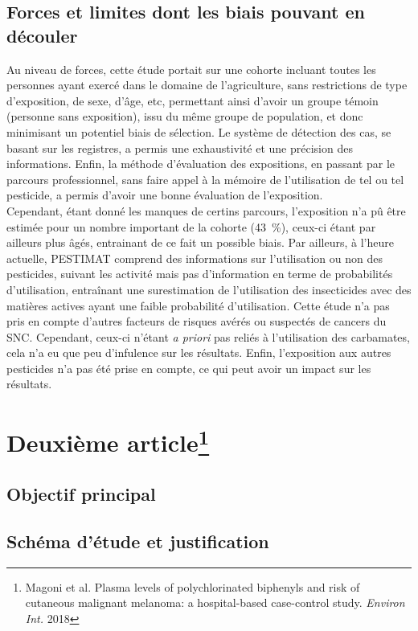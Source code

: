 \documentclass[10pt]{article}
\begin{document}
\subsection{Forces et limites dont les biais pouvant en découler}
Au niveau de forces, cette étude portait sur une cohorte incluant toutes les personnes ayant exercé dans le domaine de l'agriculture, sans restrictions de type d'exposition, de sexe, d'âge, etc, permettant ainsi d'avoir un groupe témoin (personne sans exposition), issu du même groupe de population, et donc minimisant un potentiel biais de sélection. Le système de détection des cas, se basant sur les registres, a permis une exhaustivité et une précision des informations. Enfin, la méthode d'évaluation des expositions, en passant par le parcours professionnel, sans faire appel à la mémoire de l'utilisation de tel ou tel pesticide, a permis d'avoir une bonne évaluation de l'exposition.\\
Cependant, étant donné les manques de certins parcours, l'exposition n'a pû être estimée pour un nombre important de la cohorte (43~\%), ceux-ci étant par ailleurs plus âgés, entrainant de ce fait un possible biais. Par ailleurs, à l'heure actuelle, PESTIMAT comprend des informations sur l'utilisation ou non des pesticides, suivant les activité mais pas d'information en terme de probabilités d'utilisation, entraînant une surestimation de l'utilisation des insecticides avec des matières actives ayant une faible probabilité d'utilisation. 
Cette étude n'a pas pris en compte d'autres facteurs de risques avérés ou suspectés de cancers du SNC. Cependant, ceux-ci n'étant \emph{a priori} pas reliés à l'utilisation des carbamates, cela n'a eu que peu d'infulence sur les résultats. 
Enfin, l'exposition aux autres pesticides n'a pas été prise en compte, ce qui peut avoir un impact sur les résultats. 
\newpage
\section{Deuxième article\protect\footnote{Magoni et al. Plasma levels of polychlorinated biphenyls and risk of cutaneous malignant melanoma: a hospital-based case-control study. \emph{Environ Int.} 2018}}
\subsection{Objectif principal}

\subsection{Schéma d'étude et justification}
\end{document}
